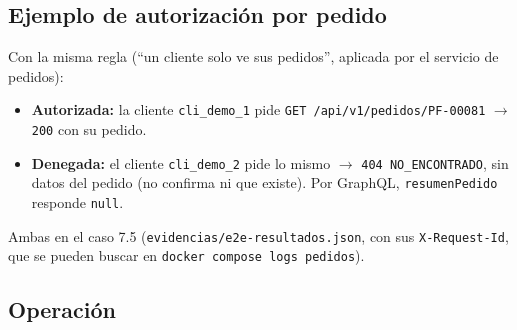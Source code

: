 \subsection{Ejemplo de autorización por pedido}

Con la misma regla (“un cliente solo ve sus pedidos”, aplicada por el servicio de pedidos):


\begin{itemize}[nosep,leftmargin=*]
\item \textbf{Autorizada:} la cliente \texttt{cli\_\allowbreak{}demo\_\allowbreak{}1} pide \texttt{GET /\allowbreak{}api/\allowbreak{}v1/\allowbreak{}pedidos/\allowbreak{}PF-\allowbreak{}00081} $\rightarrow$ \texttt{200} con su pedido.
\item \textbf{Denegada:} el cliente \texttt{cli\_\allowbreak{}demo\_\allowbreak{}2} pide lo mismo $\rightarrow$ \texttt{404 NO\_\allowbreak{}ENCONTRADO}, sin datos del pedido (no confirma ni que existe). Por GraphQL, \texttt{resumenPedido} responde \texttt{null}.
\end{itemize}

Ambas en el caso 7.5 (\texttt{evidencias/\allowbreak{}e2e-\allowbreak{}resultados.\allowbreak{}json}, con sus \texttt{X-\allowbreak{}Request-\allowbreak{}Id}, que se pueden buscar en \texttt{docker compose logs pedidos}).


\subsection{Operación}

